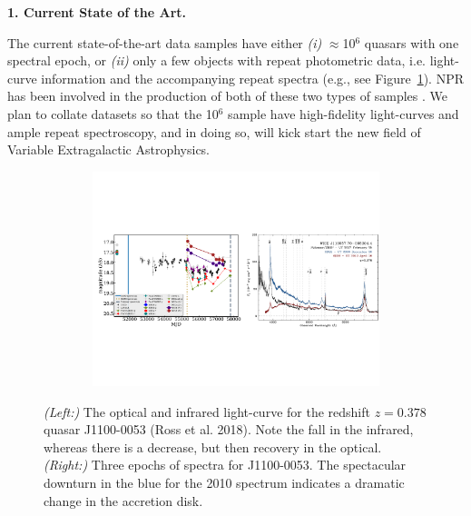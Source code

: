 \documentclass[oneside, a4paper, onecolumn, 11pt]{article}
\begin{document}
\medskip
\medskip
\noindent
\large
{\bf{\textcolor{Cerulean}{1. Current State of the Art.}}}
\normalsize

\smallskip
\noindent
The current state-of-the-art data samples have either {\it (i)} $\approx$10$^{6}$ quasars with one spectral epoch, or {\it (ii)} only a few objects with repeat photometric data, i.e. light-curve information and the accompanying repeat spectra (e.g., see Figure~\ref{fig:J110057}).  NPR has been involved in the production of both of these two types of samples \citep{Paris2017, MacLeod2016, Ross2018}. We plan to collate datasets so that the 10$^{6}$ sample have high-fidelity light-curves and ample repeat spectroscopy, 
and in doing so, will kick start the new field of Variable Extragalactic Astrophysics. 


\begin{figure}[h]
  \begin{center}
    \hspace{-0.5cm}
    \includegraphics[height=6.25cm,width=17.2cm]
    {figures/J110057_LC_Spectra_20171024.pdf}
    \vspace{-10pt}
    \caption{%
      \footnotesize 
      {\it (Left:)} The optical and infrared light-curve for the redshift $z=0.378$ quasar 
      J1100-0053 (Ross et al. 2018). 
      Note the fall in the infrared, whereas there is a decrease, but 
      then recovery in the optical. 
      {\it (Right:)} 
      Three epochs of spectra for J1100-0053. 
      The spectacular downturn in the blue for the 2010 spectrum 
      indicates a dramatic change in the accretion disk.
    }
  \vspace{-16pt}
 \label{fig:J110057}
\end{center}
\end{figure}
\end{document}
